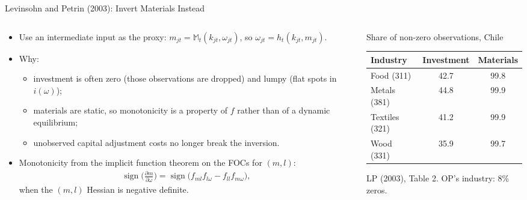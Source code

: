 \documentclass[aspectratio=169,10pt]{beamer}
\begin{document}
\begin{frame}{Levinsohn and Petrin (2003): Invert Materials Instead}
\small
\begin{columns}[T]
\begin{column}{0.55\textwidth}
\begin{itemize}
\item Use an intermediate input as the proxy: $m_{jt} = \mathbb{M}_t(k_{jt}, \omega_{jt})$, so $\omega_{jt} = h_t(k_{jt}, m_{jt})$.
\item Why:
\begin{itemize}
\item investment is often zero (those observations are dropped) and lumpy (flat spots in $i(\omega)$);
\item materials are static, so monotonicity is a property of $f$ rather than of a dynamic equilibrium;
\item unobserved capital adjustment costs no longer break the inversion.
\end{itemize}
\item Monotonicity from the implicit function theorem on the FOCs for $(m, l)$:
\begin{align*}
\operatorname{sign}\!\Big(\frac{\partial m}{\partial \omega}\Big) = \operatorname{sign}\big(f_{ml} f_{l\omega} - f_{ll} f_{m\omega}\big),
\end{align*}
when the $(m,l)$ Hessian is negative \alert{definite}.
\end{itemize}
\end{column}
\begin{column}{0.43\textwidth}
\begin{center}
\scriptsize
Share of non-zero observations, Chile
\renewcommand{\arraystretch}{1.1}
\begin{tabular}{lcc}
\toprule
Industry & Investment & Materials \\
\midrule
Food (311) & 42.7 & 99.8 \\
Metals (381) & 44.8 & 99.9 \\
Textiles (321) & 41.2 & 99.9 \\
Wood (331) & 35.9 & 99.7 \\
\bottomrule
\end{tabular}

{\tiny LP (2003), Table 2. OP's industry: 8\% zeros.}
\end{center}
\end{column}
\end{columns}
\end{frame}
\end{document}
